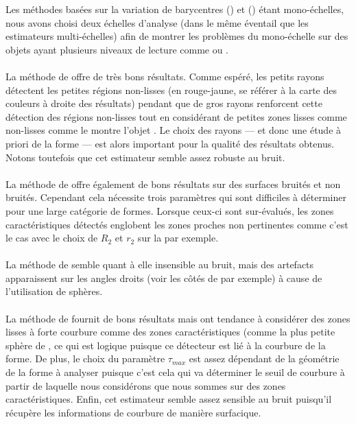 Les méthodes basées sur la variation de barycentres () et \VCM
() étant mono-échelles, nous avons choisi deux échelles
d'analyse (dans le même éventail que les estimateurs multi-échelles) afin de
montrer les problèmes du mono-échelle sur des objets ayant plusieurs niveaux de
lecture comme \CubeSphere ou \SpheresUnion.
%
\paragraph{}
%
La méthode de  offre de très bons résultats. Comme espéré, les petits
rayons détectent les petites régions non-lisses (en rouge-jaune, se référer à la
carte des couleurs à droite des résultats) pendant que de gros rayons renforcent
cette détection des régions non-lisses tout en considérant de petites zones
lisses comme non-lisses comme le montre l'objet \SpheresUnion. Le choix
des rayons --- et donc une étude à priori de la forme --- est alors important
pour la qualité des résultats obtenus. Notons toutefois que cet estimateur
semble assez robuste au bruit.
%
\paragraph{}
%
La méthode de  offre également de bons résultats sur des
surfaces bruités et non bruités. Cependant cela nécessite trois paramètres qui
sont difficiles à déterminer pour une large catégorie de formes. Lorsque ceux-ci
sont sur-évalués, les zones caractéristiques détectés englobent les zones
proches non pertinentes comme c'est le cas avec le choix de $R_2$ et $r_2$ sur
la  par exemple.
%
\paragraph{}
%
La méthode de  semble quant à elle insensible au bruit, mais des artefacts
apparaissent sur les angles droits (voir les côtés de \CubeSphere par
exemple) à cause de l'utilisation de sphères.
%
\paragraph{}
%
La méthode de  fournit de bons résultats mais ont tendance à considérer
des zones lisses à forte courbure comme des zones caractéristiques (comme la
plus petite sphère de \SpheresUnion, ce qui est logique puisque ce
détecteur est lié à la courbure de la forme. De plus, le choix du paramètre
$\tau_{max}$ est assez dépendant de la géométrie de la forme à analyser puisque
c'est cela qui va déterminer le seuil de courbure à partir de laquelle nous
considérons que nous sommes sur des zones caractéristiques. Enfin, cet
estimateur semble assez sensible au bruit puisqu'il récupère les informations de
courbure de manière surfacique.
%
